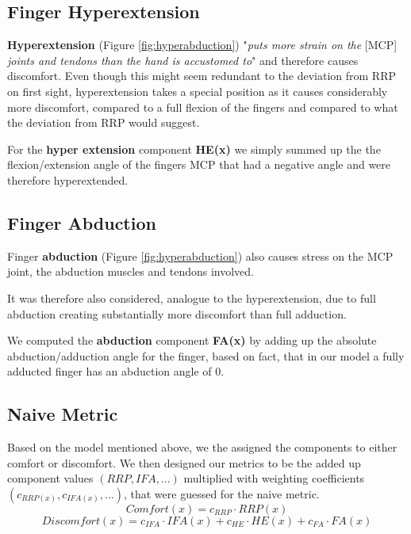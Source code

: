 \documentclass{sig-alternate-05-2015}
\begin{document}
\subsection{Finger Hyperextension}

\textbf{Hyperextension} (Figure \ref{fig:hyperabduction}) "\textit{puts more strain on the }[MCP] \textit{joints and tendons than the hand is accustomed to}" \cite{laviola1999survey} and therefore causes discomfort.\cite{laviola1999survey}
Even though this might seem redundant to the deviation from RRP on first sight, hyperextension takes a special position as it causes considerably more discomfort, compared to a full flexion of the fingers and compared to what the deviation from RRP would suggest.

For the \textbf{hyper extension} component \textbf{HE(x)} we simply summed up the the flexion/extension angle of the fingers MCP that had a negative angle and were therefore hyperextended.

\subsection{Finger Abduction}

Finger \textbf{abduction} (Figure \ref{fig:hyperabduction})
also causes stress on the MCP joint, the abduction muscles and tendons involved.

It was therefore also considered, analogue to the hyperextension, due to full abduction creating substantially more discomfort than full adduction.

We computed the \textbf{abduction} component \textbf{FA(x)} by adding up the absolute abduction/adduction angle for the finger, based on fact, that in our model a fully adducted finger has an abduction angle of 0.


\subsection{Naive Metric}


Based on the model mentioned above\cite{vink2012editorial}, we the assigned the components to either comfort or discomfort. We then designed our metrics to be the added up component values \begin{math}(RRP, IFA, ...)\end{math} multiplied with weighting coefficients \begin{math}(c_{RRP(x)}, c_{IFA(x)}, ...)\end{math}, that were guessed for the naive metric.
	\[
	Comfort(x) = c_{RRP}\cdot RRP(x)
	\]
	\[
	Discomfort(x) = c_{IFA}\cdot IFA(x)  +  c_{HE}\cdot HE(x)  +  c_{FA}\cdot FA(x)
	\]
\end{document}
